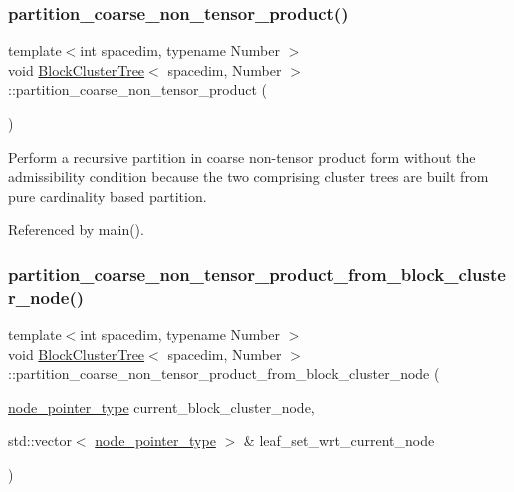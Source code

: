 \subsubsection{\texorpdfstring{partition\+\_\+coarse\+\_\+non\+\_\+tensor\+\_\+product()}{partition\_coarse\_non\_tensor\_product()}}
{\footnotesize\ttfamily template$<$int spacedim, typename Number $>$ \\
void \hyperlink{classBlockClusterTree}{Block\+Cluster\+Tree}$<$ spacedim, Number $>$\+::partition\+\_\+coarse\+\_\+non\+\_\+tensor\+\_\+product (\begin{DoxyParamCaption}{ }\end{DoxyParamCaption})}

Perform a recursive partition in coarse non-\/tensor product form without the admissibility condition because the two comprising cluster trees are built from pure cardinality based partition. 

Referenced by main().

\mbox{\label{classBlockClusterTree_a61b6c204f3f1d5ff7c71a07b26ca9d09}} 
\subsubsection{\texorpdfstring{partition\+\_\+coarse\+\_\+non\+\_\+tensor\+\_\+product\+\_\+from\+\_\+block\+\_\+cluster\+\_\+node()}{partition\_coarse\_non\_tensor\_product\_from\_block\_cluster\_node()}}
{\footnotesize\ttfamily template$<$int spacedim, typename Number $>$ \\
void \hyperlink{classBlockClusterTree}{Block\+Cluster\+Tree}$<$ spacedim, Number $>$\+::partition\+\_\+coarse\+\_\+non\+\_\+tensor\+\_\+product\+\_\+from\+\_\+block\+\_\+cluster\+\_\+node (\begin{DoxyParamCaption}\item[{\hyperlink{classTreeNode}{node\+\_\+pointer\+\_\+type}}]{current\+\_\+block\+\_\+cluster\+\_\+node,  }\item[{std\+::vector$<$ \hyperlink{classTreeNode}{node\+\_\+pointer\+\_\+type} $>$ \&}]{leaf\+\_\+set\+\_\+wrt\+\_\+current\+\_\+node }\end{DoxyParamCaption})\hspace{0.3cm}{\ttfamily [private]}}

